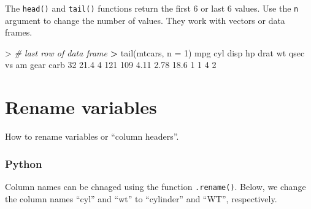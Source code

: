 \documentclass[
]{book}
\newenvironment{Shaded}{\begin{snugshade}}{\end{snugshade}}
\newcommand{\AttributeTok}[1]{\textcolor[rgb]{0.77,0.63,0.00}{#1}}
\newcommand{\CommentTok}[1]{\textcolor[rgb]{0.56,0.35,0.01}{\textit{#1}}}
\newcommand{\DecValTok}[1]{\textcolor[rgb]{0.00,0.00,0.81}{#1}}
\newcommand{\ErrorTok}[1]{\textcolor[rgb]{0.64,0.00,0.00}{\textbf{#1}}}
\newcommand{\FloatTok}[1]{\textcolor[rgb]{0.00,0.00,0.81}{#1}}
\newcommand{\FunctionTok}[1]{\textcolor[rgb]{0.00,0.00,0.00}{#1}}
\newcommand{\NormalTok}[1]{#1}
\newcommand{\SpecialCharTok}[1]{\textcolor[rgb]{0.00,0.00,0.00}{#1}}
\begin{document}
The \texttt{head()} and \texttt{tail()} functions return the first 6 or last 6 values. Use the \texttt{n} argument to change the number of values. They work with vectors or data frames.

\begin{Shaded}
\end{Shaded}

\begin{Shaded}
\begin{Highlighting}[]
\SpecialCharTok{\textgreater{}} \CommentTok{\# last row of data frame}
\ErrorTok{\textgreater{}} \FunctionTok{tail}\NormalTok{(mtcars, }\AttributeTok{n =} \DecValTok{1}\NormalTok{)}
\NormalTok{    mpg cyl disp  hp drat   wt qsec vs am gear carb}
\DecValTok{32} \FloatTok{21.4}   \DecValTok{4}  \DecValTok{121} \DecValTok{109} \FloatTok{4.11} \FloatTok{2.78} \FloatTok{18.6}  \DecValTok{1}  \DecValTok{1}    \DecValTok{4}    \DecValTok{2}
\end{Highlighting}
\end{Shaded}

\hypertarget{rename-variables}{%
\section{Rename variables}\label{rename-variables}}

How to rename variables or ``column headers''.

\hypertarget{python-16}{%
\subsubsection*{Python}\label{python-16}}

Column names can be chnaged using the function \texttt{.rename()}. Below, we change the column names ``cyl'' and ``wt'' to ``cylinder'' and ``WT'', respectively.
\end{document}
